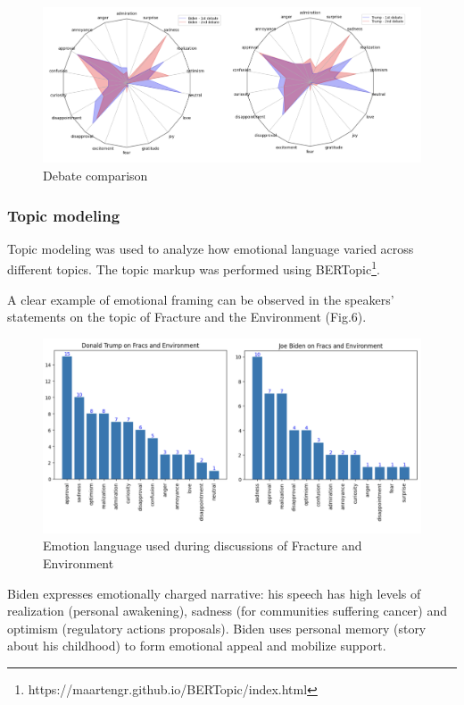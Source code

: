 \documentclass[pdflatex,sn-mathphys-num]{sn-jnl}%
\begin{document}
\begin{figure}[h]
	\centering
	\includegraphics[width=14cm]{f5-debate_comparison.png}
	\caption{Debate comparison}
\end{figure}

\subsubsection{Topic modeling}

Topic modeling was used to analyze how emotional language varied across different topics. The topic markup was performed using BERTopic\footnote{https://maartengr.github.io/BERTopic/index.html}.

A clear example of emotional framing can be observed in the speakers' statements on the topic of Fracture and the Environment (Fig.6).

\begin{figure}[H]
	\centering
	\includegraphics[width=14cm]{f6-fracture_and_environment.png}
	\caption{Emotion language used during discussions of Fracture and Environment}
\end{figure}

Biden expresses emotionally charged narrative: his speech has high levels of realization (personal awakening), sadness (for communities suffering cancer) and optimism (regulatory actions proposals). Biden uses personal memory (story about his childhood) to form emotional appeal and mobilize support.
\end{document}
